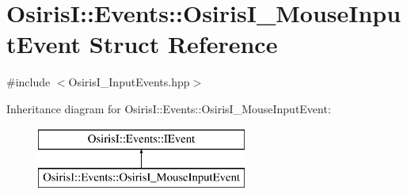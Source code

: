 \hypertarget{struct_osiris_i_1_1_events_1_1_osiris_i___mouse_input_event}{\section{Osiris\-I\-:\-:Events\-:\-:Osiris\-I\-\_\-\-Mouse\-Input\-Event Struct Reference}
\label{struct_osiris_i_1_1_events_1_1_osiris_i___mouse_input_event}
}


{\ttfamily \#include $<$Osiris\-I\-\_\-\-Input\-Events.\-hpp$>$}

Inheritance diagram for Osiris\-I\-:\-:Events\-:\-:Osiris\-I\-\_\-\-Mouse\-Input\-Event\-:\begin{figure}[H]
\begin{center}
\leavevmode
\includegraphics[height=2.000000cm]{struct_osiris_i_1_1_events_1_1_osiris_i___mouse_input_event}
\end{center}
\end{figure}
